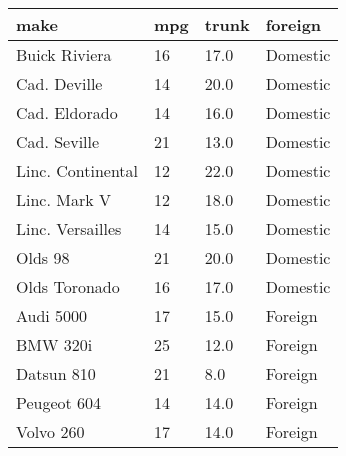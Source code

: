 \documentclass{article}
\begin{document}
\begin{table}[tbp] \centering
{}

\begin{tabularx}{\linewidth}{@{}lCCC@{}}

\toprule
{make}&{mpg}&{trunk}&{foreign} \tabularnewline
\midrule \addlinespace[\belowrulesep]
Buick Riviera&16&17.0&Domestic \tabularnewline
Cad. Deville&14&20.0&Domestic \tabularnewline
Cad. Eldorado&14&16.0&Domestic \tabularnewline
Cad. Seville&21&13.0&Domestic \tabularnewline
Linc. Continental&12&22.0&Domestic \tabularnewline
Linc. Mark V&12&18.0&Domestic \tabularnewline
Linc. Versailles&14&15.0&Domestic \tabularnewline
Olds 98&21&20.0&Domestic \tabularnewline
Olds Toronado&16&17.0&Domestic \tabularnewline
Audi 5000&17&15.0&Foreign \tabularnewline
BMW 320i&25&12.0&Foreign \tabularnewline
Datsun 810&21&8.0&Foreign \tabularnewline
Peugeot 604&14&14.0&Foreign \tabularnewline
Volvo 260&17&14.0&Foreign \tabularnewline
\bottomrule 

\end{tabularx}
\end{table}
\end{document}
